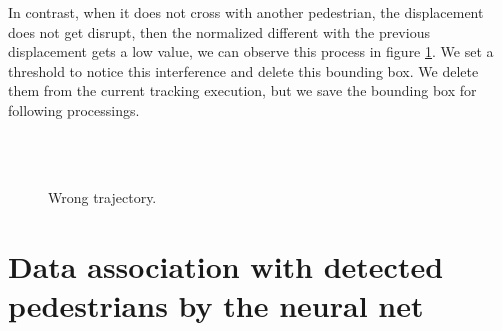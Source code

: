 In contrast, when it does not cross with another pedestrian, the displacement does not get disrupt, then the normalized different with the previous displacement gets a low value, we can observe this process in figure \ref{motion2nocoorrect}. We set a threshold to notice this interference and delete this bounding box. We delete them from the current tracking execution, but we save the bounding box for following processings.

\begin{figure}[H]
		
\centering

\\
\\
\caption{Wrong trajectory.}
\label{motion2nocoorrect}
\end{figure}













\section{Data association with detected pedestrians by the neural net}

